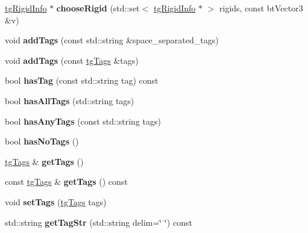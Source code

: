 \begin{DoxyCompactItemize}
\item 
\hypertarget{classtg_connector_info_a9e311f259b07b3e07d5b82612370212d}{\hyperlink{classtg_rigid_info}{tg\-Rigid\-Info} $\ast$ {\bfseries choose\-Rigid} (std\-::set$<$ \hyperlink{classtg_rigid_info}{tg\-Rigid\-Info} $\ast$ $>$ rigids, const bt\-Vector3 \&v)}\label{classtg_connector_info_a9e311f259b07b3e07d5b82612370212d}

\item 
\hypertarget{classtg_taggable_af0b8f1729653b0b90d2fecbd51163612}{void {\bfseries add\-Tags} (const std\-::string \&space\-\_\-separated\-\_\-tags)}\label{classtg_taggable_af0b8f1729653b0b90d2fecbd51163612}

\item 
\hypertarget{classtg_taggable_af28e3fe1a7e4eb28772dc006d575dd1f}{void {\bfseries add\-Tags} (const \hyperlink{classtg_tags}{tg\-Tags} \&tags)}\label{classtg_taggable_af28e3fe1a7e4eb28772dc006d575dd1f}

\item 
\hypertarget{classtg_taggable_ae31f65869c8887bfeb34a344902c4d5b}{bool {\bfseries has\-Tag} (const std\-::string tag) const }\label{classtg_taggable_ae31f65869c8887bfeb34a344902c4d5b}

\item 
\hypertarget{classtg_taggable_a33b77b1075171b63f673965687b2e844}{bool {\bfseries has\-All\-Tags} (std\-::string tags)}\label{classtg_taggable_a33b77b1075171b63f673965687b2e844}

\item 
\hypertarget{classtg_taggable_af14af28fa98021c4f20a5e8f2ddd5606}{bool {\bfseries has\-Any\-Tags} (const std\-::string tags)}\label{classtg_taggable_af14af28fa98021c4f20a5e8f2ddd5606}

\item 
\hypertarget{classtg_taggable_adff345e116e16420c701a748ff8f995f}{bool {\bfseries has\-No\-Tags} ()}\label{classtg_taggable_adff345e116e16420c701a748ff8f995f}

\item 
\hypertarget{classtg_taggable_acf1d7fa9df8f374f25015c4080902681}{\hyperlink{classtg_tags}{tg\-Tags} \& {\bfseries get\-Tags} ()}\label{classtg_taggable_acf1d7fa9df8f374f25015c4080902681}

\item 
\hypertarget{classtg_taggable_ae70d7d3b45301665bc363b0ed8b9b292}{const \hyperlink{classtg_tags}{tg\-Tags} \& {\bfseries get\-Tags} () const }\label{classtg_taggable_ae70d7d3b45301665bc363b0ed8b9b292}

\item 
\hypertarget{classtg_taggable_a5492888e4e4da4cca6261070b5726adf}{void {\bfseries set\-Tags} (\hyperlink{classtg_tags}{tg\-Tags} tags)}\label{classtg_taggable_a5492888e4e4da4cca6261070b5726adf}

\item 
\hypertarget{classtg_taggable_a346d66b066d2d9eb1eadba01da43749f}{std\-::string {\bfseries get\-Tag\-Str} (std\-::string delim=\char`\"{} \char`\"{}) const }\label{classtg_taggable_a346d66b066d2d9eb1eadba01da43749f}

\end{DoxyCompactItemize}
